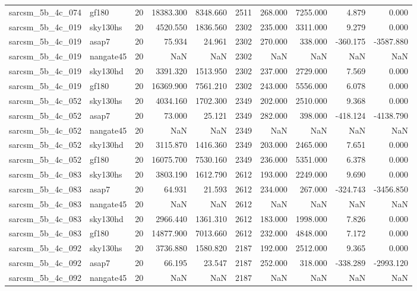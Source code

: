\begin{longtable}{llrrrrrrrr}
sarcsm\_5b\_4c\_074 & gf180 & 20 & 18383.300 & 8348.660 & 2511 & 268.000 & 7255.000 & 4.879 & 0.000 \\
sarcsm\_5b\_4c\_019 & sky130hs & 20 & 4520.550 & 1836.560 & 2302 & 235.000 & 3311.000 & 9.279 & 0.000 \\
sarcsm\_5b\_4c\_019 & asap7 & 20 & 75.934 & 24.961 & 2302 & 270.000 & 338.000 & -360.175 & -3587.880 \\
sarcsm\_5b\_4c\_019 & nangate45 & 20 & NaN & NaN & 2302 & NaN & NaN & NaN & NaN \\
sarcsm\_5b\_4c\_019 & sky130hd & 20 & 3391.320 & 1513.950 & 2302 & 237.000 & 2729.000 & 7.569 & 0.000 \\
sarcsm\_5b\_4c\_019 & gf180 & 20 & 16369.900 & 7561.210 & 2302 & 243.000 & 5556.000 & 6.078 & 0.000 \\
sarcsm\_5b\_4c\_052 & sky130hs & 20 & 4034.160 & 1702.300 & 2349 & 202.000 & 2510.000 & 9.368 & 0.000 \\
sarcsm\_5b\_4c\_052 & asap7 & 20 & 73.000 & 25.121 & 2349 & 282.000 & 398.000 & -418.124 & -4138.790 \\
sarcsm\_5b\_4c\_052 & nangate45 & 20 & NaN & NaN & 2349 & NaN & NaN & NaN & NaN \\
sarcsm\_5b\_4c\_052 & sky130hd & 20 & 3115.870 & 1416.360 & 2349 & 203.000 & 2465.000 & 7.651 & 0.000 \\
sarcsm\_5b\_4c\_052 & gf180 & 20 & 16075.700 & 7530.160 & 2349 & 236.000 & 5351.000 & 6.378 & 0.000 \\
sarcsm\_5b\_4c\_083 & sky130hs & 20 & 3803.190 & 1612.790 & 2612 & 193.000 & 2249.000 & 9.690 & 0.000 \\
sarcsm\_5b\_4c\_083 & asap7 & 20 & 64.931 & 21.593 & 2612 & 234.000 & 267.000 & -324.743 & -3456.850 \\
sarcsm\_5b\_4c\_083 & nangate45 & 20 & NaN & NaN & 2612 & NaN & NaN & NaN & NaN \\
sarcsm\_5b\_4c\_083 & sky130hd & 20 & 2966.440 & 1361.310 & 2612 & 183.000 & 1998.000 & 7.826 & 0.000 \\
sarcsm\_5b\_4c\_083 & gf180 & 20 & 14877.900 & 7013.660 & 2612 & 232.000 & 4848.000 & 7.172 & 0.000 \\
sarcsm\_5b\_4c\_092 & sky130hs & 20 & 3736.880 & 1580.820 & 2187 & 192.000 & 2512.000 & 9.365 & 0.000 \\
sarcsm\_5b\_4c\_092 & asap7 & 20 & 66.195 & 23.547 & 2187 & 252.000 & 318.000 & -338.289 & -2993.120 \\
sarcsm\_5b\_4c\_092 & nangate45 & 20 & NaN & NaN & 2187 & NaN & NaN & NaN & NaN \\

\end{longtable}
